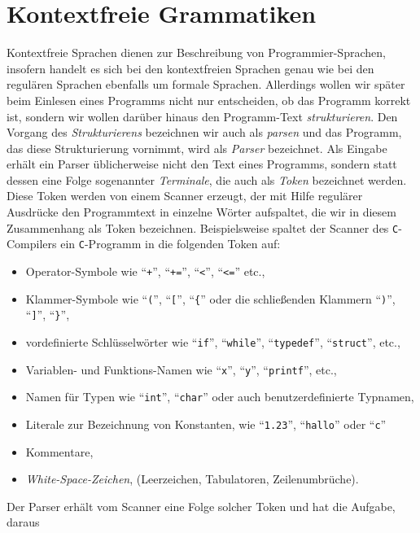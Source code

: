 \section{Kontextfreie Grammatiken \label{kontextfreie}}
Kontextfreie Sprachen dienen zur Beschreibung von Programmier-Sprachen, insofern handelt
es sich bei den kontextfreien Sprachen genau wie bei den regul\"aren Sprachen ebenfalls um
formale Sprachen.  Allerdings wollen wir sp\"ater beim Einlesen eines Programms nicht nur
entscheiden, ob das Programm korrekt ist, sondern wir wollen dar\"uber hinaus den
Programm-Text \emph{strukturieren}.  Den Vorgang des \emph{Strukturierens} bezeichnen wir
auch als \emph{parsen} und das Programm, das diese Strukturierung vornimmt, wird als
\emph{Parser} bezeichnet.  Als Eingabe erh\"alt ein Parser \"ublicherweise nicht den
Text eines Programms, sondern statt dessen eine Folge sogenannter \emph{Terminale}, die auch
als \emph{Token} bezeichnet werden.  Diese 
Token werden von einem Scanner erzeugt, der mit Hilfe regul\"arer Ausdr\"ucke den Programmtext
in einzelne W\"orter aufspaltet, die wir in diesem Zusammenhang als Token bezeichnen.
Beispielsweise spaltet der Scanner des \texttt{C}-Compilers ein \texttt{C}-Programm in die
folgenden Token auf:
\begin{itemize}
\item Operator-Symbole wie ``\texttt{+}'', ``\texttt{+=}'', ``\texttt{<}'',
      ``\texttt{<=}'' etc.,
\item Klammer-Symbole wie ``\texttt{(}'', ``\texttt{[}'', ``\texttt{\{}''  oder
      die schlie{\ss}enden Klammern ``\texttt{)}'', ``\texttt{]}'', ``\texttt{\}}'',
\item vordefinierte Schl\"usselw\"orter wie ``\texttt{if}'', ``\texttt{while}'',
      ``\texttt{typedef}'', ``\texttt{struct}'', etc.,
\item Variablen- und Funktions-Namen wie ``\texttt{x}'', ``\texttt{y}'',
      ``\texttt{printf}'', etc.,
\item Namen f\"ur Typen wie ``\texttt{int}'', ``\texttt{char}'' oder auch benutzerdefinierte
      Typnamen,
\item Literale zur Bezeichnung von Konstanten, wie ``\texttt{1.23}'', 
      ``\texttt{hallo}'' oder ``\texttt{c}''
\item Kommentare,
\item \emph{White-Space-Zeichen}, (Leerzeichen, Tabulatoren, Zeilenumbr\"uche).
\end{itemize}
Der Parser erh\"alt vom Scanner eine Folge solcher Token und hat die Aufgabe, daraus
